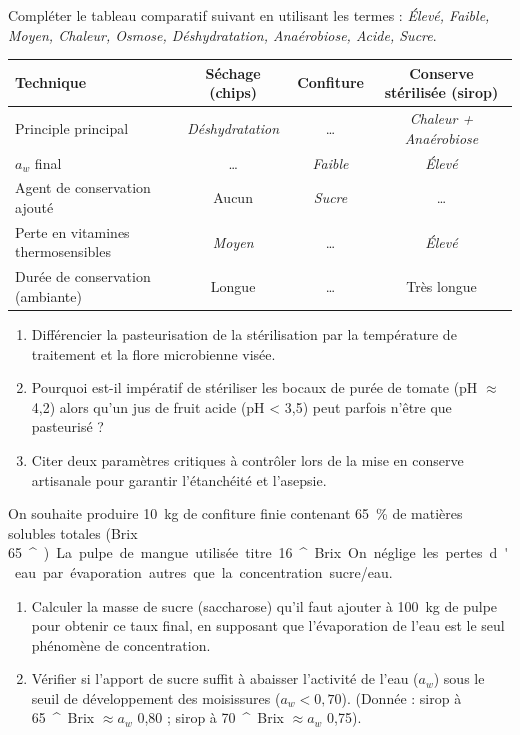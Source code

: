 \documentclass[11pt]{article}
\providecommand{\degree}{^{\circ}}
\begin{document}
\begin{exercice}
Compléter le tableau comparatif suivant en utilisant les termes : \textit{Élevé, Faible, Moyen, Chaleur, Osmose, Déshydratation, Anaérobiose, Acide, Sucre}.

\begin{tabularx}{\linewidth}{|X|c|c|c|}
\hline
\textbf{Technique} & \textbf{Séchage (chips)} & \textbf{Confiture} & \textbf{Conserve stérilisée (sirop)} \\
\hline
Principle principal & \textit{Déshydratation} & \dots & \textit{Chaleur + Anaérobiose} \\
\hline
$a_w$ final & \dots & \textit{Faible} & \textit{Élevé} \\
\hline
Agent de conservation ajouté & Aucun & \textit{Sucre} & \dots \\
\hline
Perte en vitamines thermosensibles & \textit{Moyen} & \dots & \textit{Élevé} \\
\hline
Durée de conservation (ambiante) & Longue & \dots & Très longue \\
\hline
\end{tabularx}
\end{exercice}

\begin{exercice}
\begin{enumerate}
    \item Différencier la pasteurisation de la stérilisation par la température de traitement et la flore microbienne visée.
    \item Pourquoi est-il impératif de stériliser les bocaux de purée de tomate (pH $\approx$ 4,2) alors qu'un jus de fruit acide (pH < 3,5) peut parfois n'être que pasteurisé ?
    \item Citer deux paramètres critiques à contrôler lors de la mise en conserve artisanale pour garantir l'étanchéité et l'asepsie.
\end{enumerate}
\end{exercice}

\begin{exercice}
On souhaite produire \SI{10}{\kilogram} de confiture finie contenant \SI{65}{\%} de matières solubles totales (Brix \SI{65}{\degree}). La pulpe de mangue utilisée titre \SI{16}{\degree} Brix. On néglige les pertes d'eau par évaporation autres que la concentration sucre/eau.
\begin{enumerate}
    \item Calculer la masse de sucre (saccharose) qu'il faut ajouter à \SI{100}{\kilogram} de pulpe pour obtenir ce taux final, en supposant que l'évaporation de l'eau est le seul phénomène de concentration.
    \item Vérifier si l'apport de sucre suffit à abaisser l'activité de l'eau ($a_w$) sous le seuil de développement des moisissures ($a_w < 0,70$). (Donnée : sirop à \SI{65}{\degree} Brix $\approx a_w$ 0,80 ; sirop à \SI{70}{\degree} Brix $\approx a_w$ 0,75).
\end{enumerate}
\end{exercice}
\end{document}
